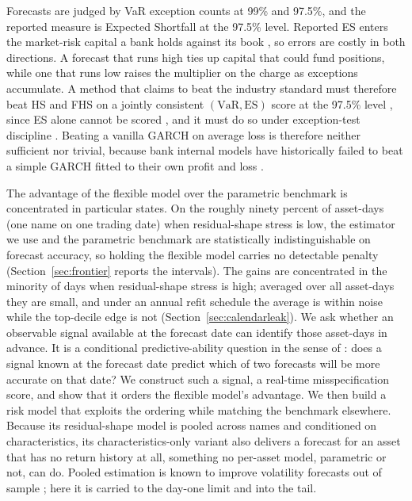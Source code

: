 \documentclass[11pt]{article}
\newcommand{\VaR}{\mathrm{VaR}}
\newcommand{\ES}{\mathrm{ES}}
\theoremstyle{remark}
\begin{document}
Forecasts are judged by VaR exception counts at 99\% and 97.5\%, and the reported measure is Expected Shortfall at the 97.5\% level. Reported ES enters the market-risk capital a bank holds against its book \citep{bcbs2019frtb}, so errors are costly in both directions. A forecast that runs high ties up capital that could fund positions, while one that runs low raises the multiplier on the charge as exceptions accumulate. A method
that claims to beat the industry standard must therefore beat HS and FHS
on a jointly consistent $(\VaR,\ES)$ score at the 97.5\% level
\citep{fissler2016}, since ES alone cannot be scored \citep{gneiting2011},
and it must do so under exception-test discipline
\citep{noldeziegel2017elicitability}. Beating a vanilla GARCH on average loss is therefore neither sufficient nor trivial, because bank
internal models have historically failed to beat a simple GARCH fitted
to their own profit and loss \citep{berkowitzobrien2002}.

The advantage of the flexible model over the parametric benchmark is concentrated in particular states. On the roughly ninety percent of asset-days (one name on one trading date) when residual-shape stress is low, the estimator we use and the parametric benchmark are statistically indistinguishable on forecast accuracy, so holding the flexible model carries no detectable penalty (Section~\ref{sec:frontier} reports the intervals). The gains are concentrated in the minority of days
when residual-shape stress is high; averaged over all asset-days they are small, and under an annual refit schedule the average is within noise while the top-decile edge is not (Section~\ref{sec:calendarleak}). We ask whether an observable signal available at the forecast date can identify those asset-days in advance. It is a
conditional predictive-ability question in the sense of
\citet{giacominiwhite2006}: does a signal known at the forecast date
predict which of two forecasts will be more accurate on that date? We
construct such a signal, a real-time misspecification score, and show
that it orders the flexible model's advantage. We then build a risk model that exploits the
ordering while matching the benchmark elsewhere. Because its
residual-shape model is pooled across names and conditioned on
characteristics, its characteristics-only variant also delivers a
forecast for an asset that has no return history at all, something no
per-asset model, parametric or not, can do. Pooled estimation is known to improve volatility forecasts out
of sample \citep{bollerslev2018risk, zhang2024commonality}; here it is
carried to the day-one limit and into the tail.
\end{document}
